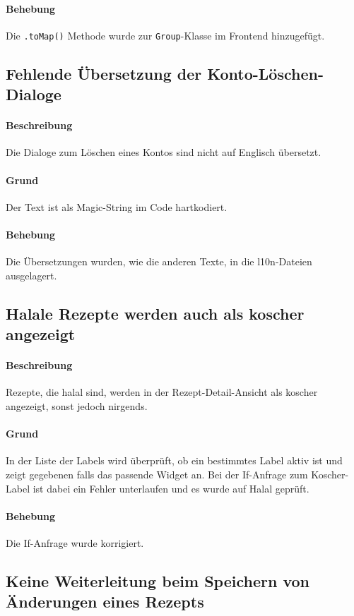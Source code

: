 \documentclass{qualitätssicherungsheft}
\begin{document}
\paragraph{Behebung} Die \texttt{.toMap()} Methode wurde zur \texttt{Group}-Klasse im Frontend hinzugefügt.
\newpage
\subsection{Fehlende Übersetzung der Konto-Löschen-Dialoge}
\paragraph*{Beschreibung} Die Dialoge zum Löschen eines Kontos sind nicht auf Englisch übersetzt.
\paragraph{Grund} Der Text ist als Magic-String im Code hartkodiert.
\paragraph{Behebung} Die Übersetzungen wurden, wie die anderen Texte, in die l10n-Dateien ausgelagert.
\newpage
\subsection{Halale Rezepte werden auch als koscher angezeigt}
\paragraph*{Beschreibung} Rezepte, die halal sind, werden in der Rezept-Detail-Ansicht als koscher angezeigt, sonst jedoch nirgends.
\paragraph{Grund} In der Liste der Labels wird überprüft, ob ein bestimmtes Label aktiv ist und zeigt gegebenen falls das passende Widget an. Bei der If-Anfrage zum Koscher-Label ist dabei ein Fehler unterlaufen und es wurde auf Halal geprüft.
\paragraph{Behebung} Die If-Anfrage wurde korrigiert.
\newpage
\subsection{Keine Weiterleitung beim Speichern von Änderungen eines Rezepts}
\end{document}
